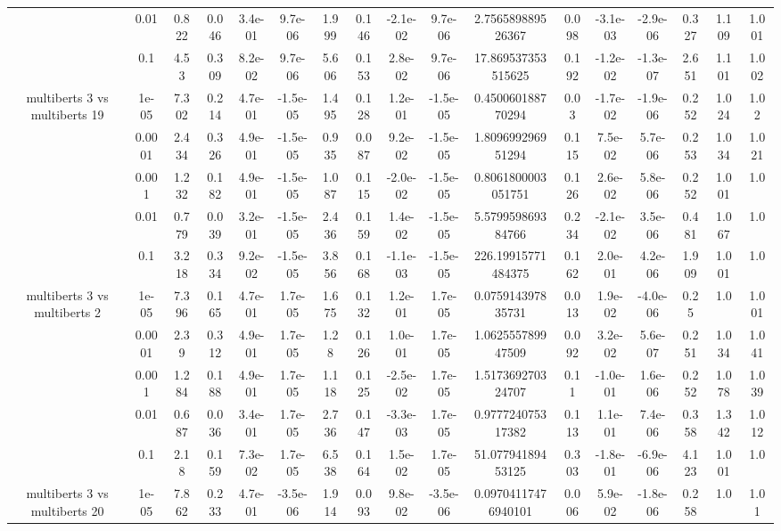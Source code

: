 \begin{tabular}{|c|c|c|c|c|c|c|c|c|c|c|c|c|c|c|c|c|}
 & 0.01 & 0.822 & 0.046 & 3.4e-01 & 9.7e-06 & 1.999 & 0.146 & -2.1e-02 & 9.7e-06 & 2.756589889526367 & 0.098 & -3.1e-03 & -2.9e-06 & 0.327 & 1.109 & 1.001 \\
 & 0.1 & 4.53 & 0.309 & 8.2e-02 & 9.7e-06 & 5.606 & 0.153 & 2.8e-02 & 9.7e-06 & 17.869537353515625 & 0.192 & -1.2e-02 & -1.3e-07 & 2.651 & 1.101 & 1.002 \\
\hline
\multirow{5}{*}{multiberts 3 vs multiberts 19} & 1e-05 & 7.302 & 0.214 & 4.7e-01 & -1.5e-05 & 1.495 & 0.128 & 1.2e-01 & -1.5e-05 & 0.450060188770294 & 0.03 & -1.7e-02 & -1.9e-06 & 0.252 & 1.024 & 1.02 \\
 & 0.0001 & 2.434 & 0.326 & 4.9e-01 & -1.5e-05 & 0.935 & 0.087 & 9.2e-02 & -1.5e-05 & 1.809699296951294 & 0.115 & 7.5e-02 & 5.7e-06 & 0.253 & 1.034 & 1.021 \\
 & 0.001 & 1.232 & 0.182 & 4.9e-01 & -1.5e-05 & 1.087 & 0.115 & -2.0e-02 & -1.5e-05 & 0.8061800003051751 & 0.126 & 2.6e-02 & 5.8e-06 & 0.252 & 1.001 & 1.0 \\
 & 0.01 & 0.779 & 0.039 & 3.2e-01 & -1.5e-05 & 2.436 & 0.159 & 1.4e-02 & -1.5e-05 & 5.579959869384766 & 0.234 & -2.1e-02 & 3.5e-06 & 0.481 & 1.067 & 1.0 \\
 & 0.1 & 3.218 & 0.334 & 9.2e-02 & -1.5e-05 & 3.856 & 0.168 & -1.1e-03 & -1.5e-05 & 226.19915771484375 & 0.162 & 2.0e-01 & 4.2e-06 & 1.909 & 1.001 & 1.0 \\
\hline
\multirow{5}{*}{multiberts 3 vs multiberts 2} & 1e-05 & 7.396 & 0.165 & 4.7e-01 & 1.7e-05 & 1.675 & 0.132 & 1.2e-01 & 1.7e-05 & 0.075914397835731 & 0.013 & 1.9e-02 & -4.0e-06 & 0.25 & 1.0 & 1.001 \\
 & 0.0001 & 2.39 & 0.312 & 4.9e-01 & 1.7e-05 & 1.28 & 0.126 & 1.0e-01 & 1.7e-05 & 1.062555789947509 & 0.092 & 3.2e-02 & 5.6e-07 & 0.251 & 1.034 & 1.041 \\
 & 0.001 & 1.284 & 0.188 & 4.9e-01 & 1.7e-05 & 1.118 & 0.125 & -2.5e-02 & 1.7e-05 & 1.517369270324707 & 0.11 & -1.0e-01 & 1.6e-06 & 0.252 & 1.078 & 1.039 \\
 & 0.01 & 0.687 & 0.036 & 3.4e-01 & 1.7e-05 & 2.736 & 0.147 & -3.3e-03 & 1.7e-05 & 0.977724075317382 & 0.113 & 1.1e-01 & 7.4e-06 & 0.358 & 1.342 & 1.012 \\
 & 0.1 & 2.18 & 0.159 & 7.3e-02 & 1.7e-05 & 6.538 & 0.164 & 1.5e-02 & 1.7e-05 & 51.07794189453125 & 0.303 & -1.8e-01 & -6.9e-06 & 4.123 & 1.001 & 1.0 \\
\hline
\multirow{5}{*}{multiberts 3 vs multiberts 20} & 1e-05 & 7.862 & 0.233 & 4.7e-01 & -3.5e-06 & 1.914 & 0.093 & 9.8e-02 & -3.5e-06 & 0.09704117476940101 & 0.006 & 5.9e-02 & -1.8e-06 & 0.258 & 1.0 & 1.01 \\

\end{tabular}
